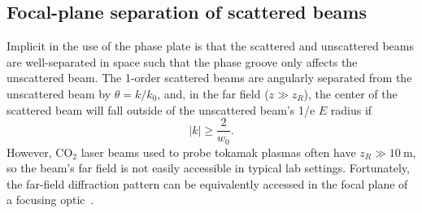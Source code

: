 \subsection{Focal-plane separation of scattered beams}
Implicit in the use of the phase plate
is that the scattered and unscattered beams
are well-separated in space
such that the phase groove only affects the unscattered beam.
The 1-order scattered beams are angularly separated
from the unscattered beam by $\theta = k / k_0$, and,
in the far field ($z \gg z_R$),
the center of the scattered beam will fall outside of
the unscattered beam's 1/e $E$ radius if
\begin{equation}
  |k| \geq \frac{2}{w_0}.
  \label{eq:InterferometricMethods:kmin_for_far_field_beam_separation}
\end{equation}
However, CO$_2$ laser beams used to probe tokamak plasmas often have
$z_R \gg \SI{10}{\meter}$, so
the beam's far field is not easily accessible in typical lab settings.
Fortunately, the far-field diffraction pattern
can be equivalently accessed in the focal plane
of a focusing optic~\cite[Ch.~8]{born_and_wolf}.

